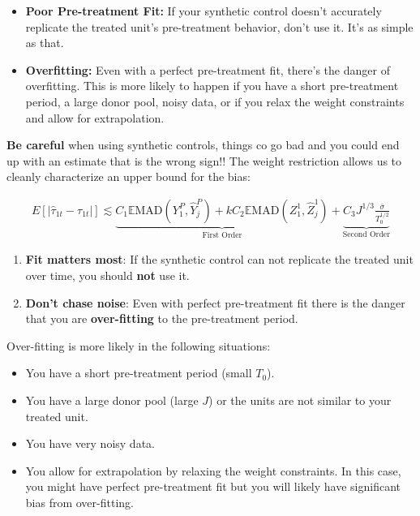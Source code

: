 \documentclass[
  letterpaper,
  DIV=11,
  numbers=noendperiod]{scrreprt}
\providecommand{\tightlist}{%
  \setlength{\itemsep}{0pt}\setlength{\parskip}{0pt}}\usepackage{longtable,booktabs,array}
\begin{document}
\begin{itemize}
\item
  \textbf{Poor Pre-treatment Fit:} If your synthetic control doesn't
  accurately replicate the treated unit's pre-treatment behavior, don't
  use it. It's as simple as that.
\item
  \textbf{Overfitting:} Even with a perfect pre-treatment fit, there's
  the danger of overfitting. This is more likely to happen if you have a
  short pre-treatment period, a large donor pool, noisy data, or if you
  relax the weight constraints and allow for extrapolation.
\end{itemize}

\textbf{Be careful} when using synthetic controls, things co go bad and
you could end up with an estimate that is the wrong sign!! The weight
restriction allows us to cleanly characterize an upper bound for the
bias:

\begin{align*}
E[|\hat{\tau}_{1t} - \tau_{1t}|] \lesssim \underbrace{C_1\mathbb{E}\text{MAD}\left(Y_1^P, \hat{Y}_j^P\right) + k C_2 \mathbb{E}\text{MAD}\left(Z_1^1,\hat{Z}_j^1\right)}_{\text{First Order}} + \underbrace{C_3 J^{1/3} \frac{\bar{\sigma}}{T_0^{1/2}}}_{\text{Second Order}}
\end{align*}

\begin{enumerate}
\def\labelenumi{\arabic{enumi}.}
\item
  \textbf{Fit matters most}: If the synthetic control can not replicate
  the treated unit over time, you should \textbf{not} use it.
\item
  \textbf{Don't chase noise}: Even with perfect pre-treatment fit there
  is the danger that you are \textbf{over-fitting} to the pre-treatment
  period.
\end{enumerate}

Over-fitting is more likely in the following situations:

\begin{itemize}
\tightlist
\item
  You have a short pre-treatment period (small \(T_0\)).
\item
  You have a large donor pool (large \(J\)) or the units are not similar
  to your treated unit.
\item
  You have very noisy data.
\item
  You allow for extrapolation by relaxing the weight constraints. In
  this case, you might have perfect pre-treatment fit but you will
  likely have significant bias from over-fitting.
\end{itemize}
\end{document}
